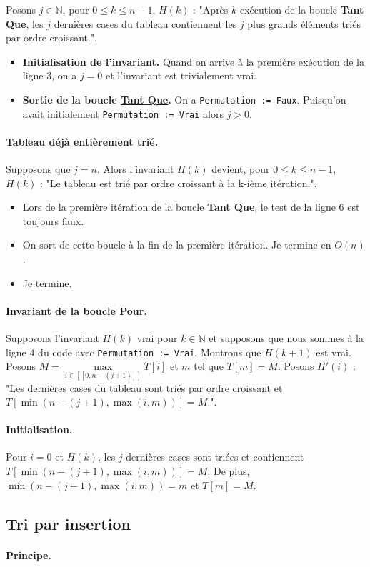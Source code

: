 \documentclass{article}
\begin{document}
    Posons $j \in \mathbb{N}$, pour $0 \le k \le n - 1$, $H(k)$ : "Après $k$ exécution de la boucle \textbf{Tant Que}, les $j$ dernières cases du tableau contiennent les $j$ plus grands éléments triés par ordre croissant.".\\

    \begin{itemize}
        \item \textbf{Initialisation de l'invariant.} Quand on arrive à la première exécution de la ligne 3, on a $j = 0$ et l'invariant est trivialement vrai.
        \item \textbf{Sortie de la boucle \underline{Tant Que}.} On a \verb|Permutation := Faux|. Puisqu'on avait initialement \verb|Permutation := Vrai| alors $j > 0$.
    \end{itemize}

    \paragraph{Tableau déjà entièrement trié.} Supposons que $j = n$. Alors l'invariant $H(k)$ devient, pour $0 \le k \le n - 1$, $H(k)$ : "Le tableau est trié par ordre croissant à la k-ième itération.".

    \begin{itemize}
        \item Lors de la première itération de la boucle \textbf{Tant Que}, le test de la ligne 6 est toujours faux.
        \item On sort de cette boucle à la fin de la première itération. Je termine en $O(n)$.
        \item Je termine.
    \end{itemize}

    \paragraph{Invariant de la boucle \textbf{Pour}.} Supposons l'invariant $H(k)$ vrai pour $k \in \mathbb{N}$ et supposons que nous sommes à la ligne 4 du code avec \verb|Permutation := Vrai|. Montrons que $H(k+1)$ est vrai.\\

    Posons $M = \max\limits_{i \in [\![0, n - (j + 1)]\!]} T[i]$ et $m$ tel que $T[m] = M$. Posons $H'(i)$ : "Les dernières cases du tableau sont triés par ordre croissant et $T[\min(n - (j + 1), \max(i, m))] = M$.".

    \paragraph{Initialisation.} Pour $i = 0$ et $H(k)$, les $j$ dernières cases sont triées et contiennent $T[\min(n - (j + 1), \max(i, m))] = M$. De plus, $\min(n - (j + 1), \max(i, m)) = m$ et $T[m] = M$.

    \subsection{Tri par insertion}

    \paragraph{Principe.}
\end{document}
